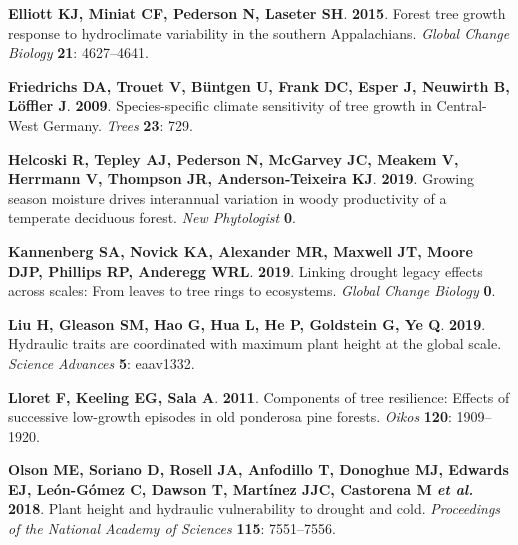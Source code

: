 \documentclass[
]{article}
\begin{document}
\leavevmode\hypertarget{ref-elliott_forest_2015}{}%
\textbf{\textnormal{Elliott KJ}, \textnormal{Miniat CF},
\textnormal{Pederson N}, \textnormal{Laseter SH}}. \textbf{2015}. Forest
tree growth response to hydroclimate variability in the southern
Appalachians. \emph{Global Change Biology} \textbf{21}: 4627--4641.

\leavevmode\hypertarget{ref-friedrichs_species-specific_2009}{}%
\textbf{\textnormal{Friedrichs DA}, \textnormal{Trouet V},
\textnormal{Büntgen U}, \textnormal{Frank DC}, \textnormal{Esper J},
\textnormal{Neuwirth B}, \textnormal{Löffler J}}. \textbf{2009}.
Species-specific climate sensitivity of tree growth in Central-West
Germany. \emph{Trees} \textbf{23}: 729.

\leavevmode\hypertarget{ref-helcoski_growing_2019}{}%
\textbf{\textnormal{Helcoski R}, \textnormal{Tepley AJ},
\textnormal{Pederson N}, \textnormal{McGarvey JC}, \textnormal{Meakem
V}, \textnormal{Herrmann V}, \textnormal{Thompson JR},
\textnormal{Anderson‐Teixeira KJ}}. \textbf{2019}. Growing season
moisture drives interannual variation in woody productivity of a
temperate deciduous forest. \emph{New Phytologist} \textbf{0}.

\leavevmode\hypertarget{ref-kannenberg_linking_2019}{}%
\textbf{\textnormal{Kannenberg SA}, \textnormal{Novick KA},
\textnormal{Alexander MR}, \textnormal{Maxwell JT}, \textnormal{Moore
DJP}, \textnormal{Phillips RP}, \textnormal{Anderegg WRL}}.
\textbf{2019}. Linking drought legacy effects across scales: From leaves
to tree rings to ecosystems. \emph{Global Change Biology} \textbf{0}.

\leavevmode\hypertarget{ref-liu_hydraulic_2019}{}%
\textbf{\textnormal{Liu H}, \textnormal{Gleason SM}, \textnormal{Hao G},
\textnormal{Hua L}, \textnormal{He P}, \textnormal{Goldstein G},
\textnormal{Ye Q}}. \textbf{2019}. Hydraulic traits are coordinated with
maximum plant height at the global scale. \emph{Science Advances}
\textbf{5}: eaav1332.

\leavevmode\hypertarget{ref-lloret_components_2011}{}%
\textbf{\textnormal{Lloret F}, \textnormal{Keeling EG}, \textnormal{Sala
A}}. \textbf{2011}. Components of tree resilience: Effects of successive
low-growth episodes in old ponderosa pine forests. \emph{Oikos}
\textbf{120}: 1909--1920.

\leavevmode\hypertarget{ref-olson_plant_2018}{}%
\textbf{\textnormal{Olson ME}, \textnormal{Soriano D},
\textnormal{Rosell JA}, \textnormal{Anfodillo T}, \textnormal{Donoghue
MJ}, \textnormal{Edwards EJ}, \textnormal{León-Gómez C},
\textnormal{Dawson T}, \textnormal{Martínez JJC}, \textnormal{Castorena
M} \emph{et al.}} \textbf{2018}. Plant height and hydraulic
vulnerability to drought and cold. \emph{Proceedings of the National
Academy of Sciences} \textbf{115}: 7551--7556.
\end{document}

